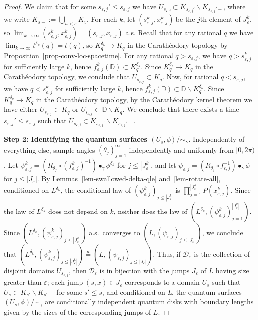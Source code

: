 \documentclass[a4paper]{article}
\numberwithin{equation}{section}
\def\eps{\varepsilon}
\newcommand{\D}{\mathbb{D}}
\newcommand{\cD}{\mathcal{D}}
\theoremstyle{remark}
\numberwithin{equation}{section}
\begin{document}
\begin{proof}
We claim that for some $s_{\eps,j}' \leq s_{\eps, j}$ we have $U_{s_{\eps,j}} \subset K_{s_{\eps,j}'} \backslash K_{s_{\eps,j}'-}$, where we write $K_{s-} := \bigcup_{u < s} K_u$. For each $k$, let $(s^k_{\eps,j}, x^k_{\eps,j})$ be the $j$th element of $J_\eps^k$, so $\lim_{k \to \infty} (s^k_{\eps,j}, x^k_{\eps,j}) = (s_{\eps,j}, x_{\eps,j})$ a.s. Recall that for any rational $q$ we have $\lim_{k \to \infty} t^{\delta_k}(q) = t(q)$, so $K^{\delta_k}_q \to K_q$ in the Carath\'eodory topology by Proposition~\ref{prop-conv-loc-spacetime}. For any rational $q > s_{\eps,j}$, we have $q > s^k_{\eps,j}$ for sufficiently large $k$, hence $f^k_{\eps,j}(\D) \subset K^{\delta_k}_{q}$. Since $K^{\delta_k}_q \to K_q$ in the Carath\'eodory topology, we conclude that $U_{s_{\eps,j}} \subset K_q$. Now, for rational $q < s_{\eps,j}$, we have $q < s^k_{\eps,j}$ for sufficiently large $k$, hence $f^k_{\eps,j}(\D) \subset \D\backslash K^{\delta_k}_q$. Since $K^{\delta_k}_q \to K_q$ in the Carath\'eodory topology, by the Carath\'eodory kernel theorem we have either $U_{s_{\eps,j}} \subset K_q$ or $U_{s_{\eps,j}} \subset \D \backslash K_q$. We conclude that there exists a time $s_{\eps,j}' \leq s_{\eps,j}$ such that $U_{s_{\eps,j}} \subset K_{s_{\eps,j}'} \backslash K_{s_{\eps,j}'-}$.


\medskip \noindent
\textbf{Step 2: Identifying the quantum surfaces $(U_s, \phi)/{\sim_\gamma}$.} 
Independently of everything else, sample angles $(\theta_j)_{j=1}^\infty$ independently and uniformly from $[0,2\pi)$. Let $\psi_{\eps,j}^k = (R_{\theta_j} \circ (f_{\eps,j}^k)^{-1}) \bullet_\gamma \phi^{\delta_k}$ for $j \leq |J_\eps^k|$, and let $\psi_{\eps,j} = (R_{\theta_j} \circ f_{\eps,j}^{-1}) \bullet_\gamma \phi$ for $j  \leq |J_\eps|$. By Lemmas~\ref{lem-swallowed-delta-qle} and~\ref{lem-rotate-all}, conditioned on $L^{\delta_k}$, the conditional law of $(\psi_{\eps,j}^k)_{j\leq|J_\eps^k|}$ is $\prod_{j=1}^{|J_\eps^k|}P(x_{\eps,j}^k)$. Since the law of $L^{\delta_k}$ does not depend on $k$, neither does the law of $(L^{\delta_k}, (\psi_{\eps,j}^k)_{j=1}^{|J_\eps^k|})$. Since $(L^{\delta_k}, (\psi_{\eps,j}^k)_{j\leq|J_\eps^k|})$ a.s.\ converges to $(L, (\psi_{\eps,j})_{j\leq|J_\eps|})$, we conclude that $(L^{\delta_k}, (\psi_{\eps,j}^k)_{j\leq|J_\eps^k|}) \stackrel d= (L, (\psi_{\eps,j})_{j\leq|J_\eps|})$. Thus, if $\cD_\eps$ is the collection of disjoint domains $U_{s_{\eps, j}}$, then $\cD_\eps$ is in bijection with the jumps $J_\eps$ of $L$ having size greater than $\eps$; each jump $(s,x) \in J_\eps$ corresponds to a domain $U_s$ such that $U_s \subset K_{s'} \backslash K_{s'-}$ for some $s' \leq s$, and conditioned on $L$, the quantum surfaces $(U_s, \phi)/{\sim_\gamma}$ are conditionally independent quantum disks with boundary lengths given by the sizes of the corresponding jumps of $L$.



\end{proof}
\end{document}
